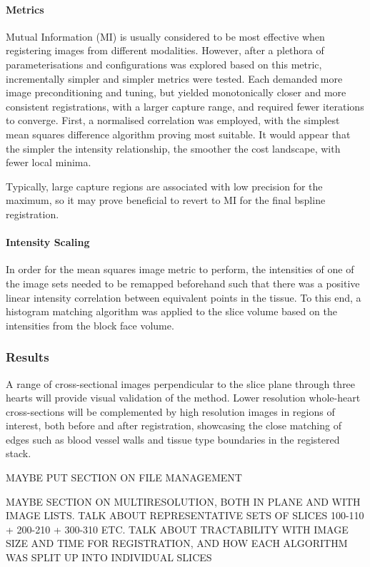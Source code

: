       \paragraph{Metrics}
        Mutual Information (MI) is usually considered to be most effective when registering images from different modalities. However, after a plethora of parameterisations and configurations was explored based on this metric, incrementally simpler and simpler metrics were tested. Each demanded more image preconditioning and tuning, but yielded monotonically closer and more consistent registrations, with a larger capture range, and required fewer iterations to converge. First, a normalised correlation was employed, with the simplest mean squares difference algorithm proving most suitable. It would appear that the simpler the intensity relationship, the smoother the cost landscape, with fewer local minima.

        Typically, large capture regions are associated with low precision for the maximum, so it may prove beneficial to revert to MI for the final bspline registration.

      \paragraph{Intensity Scaling}
        In order for the mean squares image metric to perform, the intensities of one of the image sets needed to be remapped beforehand such that there was a positive linear intensity correlation between equivalent points in the tissue. To this end, a histogram matching algorithm was applied to the slice volume based on the intensities from the block face volume.
        
  \subsubsection{Results}
    A range of cross-sectional images perpendicular to the slice plane through three hearts will provide visual validation of the method. Lower resolution whole-heart cross-sections will be complemented by high resolution images in regions of interest, both before and after registration, showcasing the close matching of edges such as blood vessel walls and tissue type boundaries in the registered stack.
    
    MAYBE PUT SECTION ON FILE MANAGEMENT
    
    MAYBE SECTION ON MULTIRESOLUTION, BOTH IN PLANE AND WITH IMAGE LISTS. TALK ABOUT REPRESENTATIVE SETS OF SLICES 100-110 + 200-210 + 300-310 ETC. TALK ABOUT TRACTABILITY WITH IMAGE SIZE AND TIME FOR REGISTRATION, AND HOW EACH ALGORITHM WAS SPLIT UP INTO INDIVIDUAL SLICES
    
